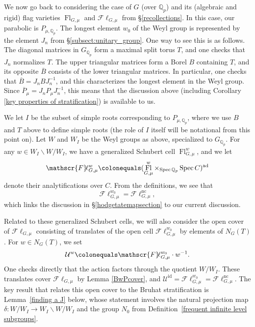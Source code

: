 \documentclass{amsart}
\theoremstyle{remark}
\numberwithin{equation}{subsection}
\newcommand{\Q}{\QQ}
\newcommand{\QQ}{{\mathbb Q}}
\newcommand{\cU}{{\mathcal U}}
\newcommand{\Qp}{\Q_p}
\DeclareMathOperator{\Flr}{Fl}
\DeclareMathOperator{\Spec}{Spec}
\newcommand{\id}{\mathrm{id}}
\newcommand{\Fl}{\mathscr{F}\!\ell}
\newcommand{\ad}{\mathrm{ad}}
\newcommand{\nc}{\mathrm{nc}}
\newcommand{\ol}{\overline}
\newcommand{\defeq}{\colonequals}
\renewcommand{\(}{\left(}
\renewcommand{\)}{\right)}
\begin{document}
We now go back to considering the case of $G$ (over $\Qp$) and its (algebraic and rigid) flag varieties $\Flr_{G,\mu}$ and $\Fl_{G,\mu}$ from \S \ref{recollections}. In this case, our parabolic is $P_{\mu,\Qp}$. The longest element $w_0$ of the Weyl group is represented by the element $J_n$ from \S \ref{subsect:unitary_group}. One way to see this is as follows. The diagonal matrices in $G_{\Qp}$ form a maximal split torus $T$, and one checks that $J_n$ normalizes $T$. The upper triangular matrices form a Borel $B$ containing $T$, and its opposite $\ol{B}$ consists of the lower triangular matrices. In particular, one checks that $\ol{B} = J_n B J_n^{-1}$, and this characterizes the longest element in the Weyl group. Since $\ol{P}_\mu = J_n P_\mu J_n^{-1}$, this means that the discussion above (including Corollary \ref{key properties of stratification}) is available to us. 

\medskip
We let $I$ be the subset of simple roots corresponding to $P_{\mu,\Qp}$, where we use $B$ and $T$ above to define simple roots (the role of $I$ itself will be notational from this point on). Let $W$ and $W_I$ be the Weyl groups as above, specialized to $G_{\Qp}$. For any $w\in W_I \backslash W / W_I$, we have a generalized Schubert cell $\Flr_{G,\mu}^w$, and we let
\[
\Fl_{G,\mu}^w \defeq (\Flr_{G,\mu}^w \times_{\Spec \Qp} \Spec C)^{\ad}
\]
denote their analytifications over $C$. From the definitions, we see that
\[
\Fl_{G,\mu}^{w_0} = \Fl_{G,\mu}^{\nc},
\] 
which links the discussion in \S \ref{hodgetatemapsection} to our current discussion.

\medskip
Related to these generalized Schubert cells, we will also consider the open cover of $\Fl_{G,\mu}$ consisting of translates of the open cell $\Fl_{G,\mu}^{w_0}$ by elements of $N_G(T)$. For $w\in N_G(T)$, we set
\[
\cU^w \defeq \Fl_{G,\mu}^{w_0}\cdot w^{-1}.
\] 
One checks directly that the action factors through the quotient $W/W_I$. These translates cover $\Fl_{G,\mu}$ by Lemma \ref{BwPcover}, and $\cU^{\id} = \Fl_{G,\mu}^{w_0} = \Fl_{G,\mu}^{\nc}$. The key result that relates this open cover to the Bruhat stratification is Lemma~\ref{finding a J} below, whose statement involves the natural projection map $\delta\colon W/W_I\to W_I\backslash W/W_I$ and the group $N_0$ from Definition~\ref{frequent infinite level subgroups}.
\end{document}
